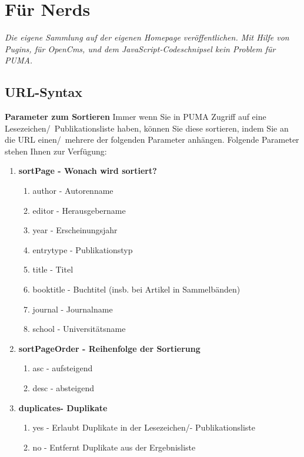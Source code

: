\chapter{Für Nerds}
\label{ch:fuerNerds}
\textit{Die eigene Sammlung auf der eigenen Homepage veröffentlichen. Mit Hilfe von Pugins, für OpenCms,  und dem JavaScript-Codeschnipsel kein Problem für PUMA.}
\section{URL-Syntax}
\label{sec:urlSyntax}
\textbf{Parameter zum Sortieren} \newline
Immer wenn Sie in PUMA Zugriff auf eine Lesezeichen/~Publikationsliste haben, können Sie diese sortieren, indem Sie an die URL einen/~mehrere der folgenden Parameter anhängen. Folgende Parameter stehen Ihnen zur Verfügung:
\begin{enumerate}
    \item \textbf{sortPage - Wonach wird sortiert?}
    \begin{enumerate}
        \item author - Autorenname
        \item editor - Herausgebername
        \item year - Erscheinungsjahr
        \item entrytype - Publikationstyp
        \item title - Titel
        \item booktitle - Buchtitel (insb. bei Artikel in Sammelbänden)
        \item journal - Journalname
        \item school - Universitätsname 
    \end{enumerate}
    \item \textbf{sortPageOrder - Reihenfolge der Sortierung}
    \begin{enumerate}
        \item asc - aufsteigend
        \item desc - absteigend 
    \end{enumerate}
    \item \textbf{duplicates- Duplikate}
    \begin{enumerate}
        \item yes - Erlaubt Duplikate in der Lesezeichen/- Publikationsliste
        \item no - Entfernt Duplikate aus der Ergebnisliste
    \end{enumerate}
\end{enumerate}
